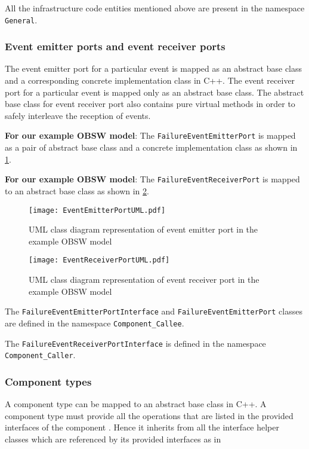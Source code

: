 All the infrastructure code entities mentioned above are present in the namespace \texttt{General}.   

\subsubsection{\textbf{Event emitter ports and event receiver ports}}
The event emitter port for a particular event is mapped as an abstract base class and a corresponding concrete implementation class in C++. The event receiver port for a particular event is mapped only as an abstract base class. The abstract base class for event receiver port also contains pure virtual methods in order to safely interleave the reception of events.  

\textbf{For our example OBSW model}: The \texttt{FailureEvent\allowbreak EmitterPort} is mapped as a pair of abstract base class and a concrete implementation class as shown in \cref{fig: Event emitter port UML}.  

\textbf{For our example OBSW model}: The \texttt{FailureEvent\allowbreak ReceiverPort} is mapped to an abstract base class as shown in \cref{fig: Event receiver port UML}.

\begin{figure}[h]
	\centering
	\texttt{[image: EventEmitterPortUML.pdf]}
	\caption{UML class diagram representation of event emitter port in the example OBSW model}
	\label{fig: Event emitter port UML}
\end{figure}

\begin{figure}[h]
	\centering
	\texttt{[image: EventReceiverPortUML.pdf]}
	\caption{UML class diagram representation of event receiver port in the example OBSW model}
	\label{fig: Event receiver port UML}
\end{figure} 

The \texttt{FailureEvent\allowbreak Emitter\allowbreak Port\allowbreak Interface} and \texttt{FailureEvent\allowbreak Emitter\allowbreak Port} classes are defined in the namespace \texttt{Component\allowbreak \_Callee}. 

The \texttt{FailureEvent\allowbreak Receiver\allowbreak Port\allowbreak Interface} is defined in the namespace \texttt{Component\allowbreak\_Caller}.

\subsubsection{\textbf{Component types}}
A component type can be mapped to an abstract base class in C++. A component type must provide all the operations that are listed in the provided interfaces of the component \cite{CompBasedProcess}. Hence it inherits from all the interface helper classes which are referenced by its provided interfaces as in \cite{EvoRAVCodeAr} 

